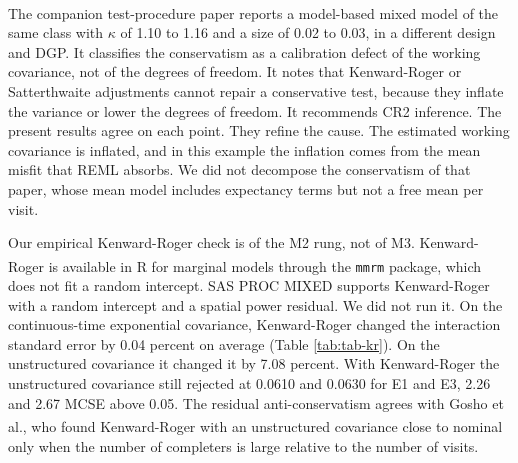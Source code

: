 \documentclass[
  11pt,
]{article}
\begin{document}
The companion test-procedure paper\textsuperscript{} reports a
model-based mixed model of the same class with \(\kappa\) of 1.10 to
1.16 and a size of 0.02 to 0.03, in a different design and DGP. It
classifies the conservatism as a calibration defect of the working
covariance, not of the degrees of freedom. It notes that Kenward-Roger
or Satterthwaite adjustments cannot repair a conservative test,
because they inflate the variance or lower the degrees of freedom. It
recommends CR2 inference. The present results agree on each point.
They refine the cause. The estimated working covariance is inflated,
and in this example the inflation comes from the mean misfit that
REML absorbs. We did not decompose the conservatism of that paper,
whose mean model includes expectancy terms but not a free mean per
visit.

Our empirical Kenward-Roger check is of the M2 rung, not of M3.
Kenward-Roger is available in R for marginal models through the
\texttt{mmrm} package\textsuperscript{}, which does not fit a random intercept. SAS
PROC MIXED supports Kenward-Roger with a random intercept and a
spatial power residual. We did not run it. On the continuous-time
exponential covariance, Kenward-Roger changed the interaction standard
error by 0.04 percent on average (Table
\ref{tab:tab-kr}). On the unstructured covariance it changed it by
7.08 percent. With Kenward-Roger the unstructured
covariance still rejected at 0.0610
and 0.0630 for E1 and E3,
2.26 and
2.67 MCSE above 0.05. The
residual anti-conservatism agrees with Gosho et al.\textsuperscript{},
who found Kenward-Roger with an unstructured covariance close to
nominal only when the number of completers is large relative to the
number of visits.
\end{document}
